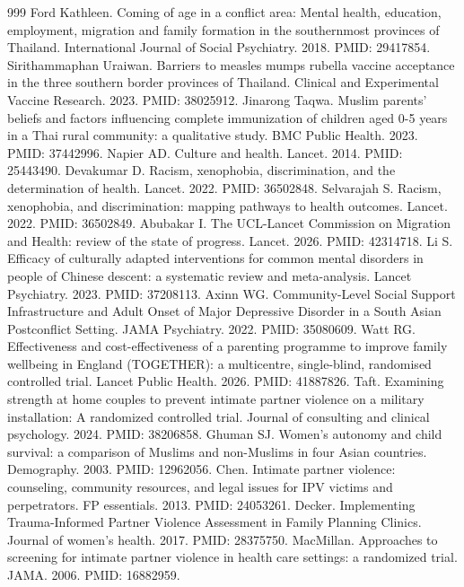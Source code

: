 \begin{thebibliography}{999}
 Ford Kathleen. Coming of age in a conflict area: Mental health, education, employment, migration and family formation in the southernmost provinces of Thailand. International Journal of Social Psychiatry. 2018. PMID: 29417854.
 Sirithammaphan Uraiwan. Barriers to measles mumps rubella vaccine acceptance in the three southern border provinces of Thailand. Clinical and Experimental Vaccine Research. 2023. PMID: 38025912.
 Jinarong Taqwa. Muslim parents' beliefs and factors influencing complete immunization of children aged 0-5 years in a Thai rural community: a qualitative study. BMC Public Health. 2023. PMID: 37442996.
 Napier AD. Culture and health. Lancet. 2014. PMID: 25443490.
 Devakumar D. Racism, xenophobia, discrimination, and the determination of health. Lancet. 2022. PMID: 36502848.
 Selvarajah S. Racism, xenophobia, and discrimination: mapping pathways to health outcomes. Lancet. 2022. PMID: 36502849.
 Abubakar I. The UCL-Lancet Commission on Migration and Health: review of the state of progress. Lancet. 2026. PMID: 42314718.
 Li S. Efficacy of culturally adapted interventions for common mental disorders in people of Chinese descent: a systematic review and meta-analysis. Lancet Psychiatry. 2023. PMID: 37208113.
 Axinn WG. Community-Level Social Support Infrastructure and Adult Onset of Major Depressive Disorder in a South Asian Postconflict Setting. JAMA Psychiatry. 2022. PMID: 35080609.
 Watt RG. Effectiveness and cost-effectiveness of a parenting programme to improve family wellbeing in England (TOGETHER): a multicentre, single-blind, randomised controlled trial. Lancet Public Health. 2026. PMID: 41887826.
 Taft. Examining strength at home couples to prevent intimate partner violence on a military installation: A randomized controlled trial. Journal of consulting and clinical psychology. 2024. PMID: 38206858.
 Ghuman SJ. Women's autonomy and child survival: a comparison of Muslims and non-Muslims in four Asian countries. Demography. 2003. PMID: 12962056.
 Chen. Intimate partner violence: counseling, community resources, and legal issues for IPV victims and perpetrators. FP essentials. 2013. PMID: 24053261.
 Decker. Implementing Trauma-Informed Partner Violence Assessment in Family Planning Clinics. Journal of women's health. 2017. PMID: 28375750.
 MacMillan. Approaches to screening for intimate partner violence in health care settings: a randomized trial. JAMA. 2006. PMID: 16882959.

\end{thebibliography}
